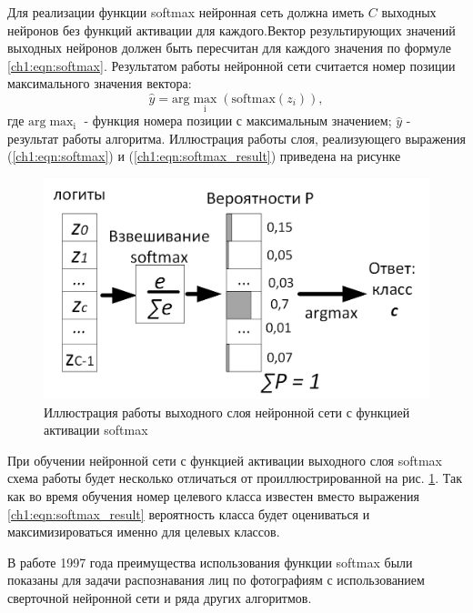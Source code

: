 \documentclass[12pt]{article}
\begin{document}
\begin{sloppypar}
Для реализации функции softmax нейронная сеть должна иметь $C$ выходных нейронов без функций активации для каждого.Вектор результирующих значений выходных нейронов должен быть пересчитан для каждого значения по формуле  \ref{ch1:eqn:softmax}. Результатом работы нейронной сети считается номер позиции максимального значения вектора:
    \begin{equation}
    \label{ch1:eqn:softmax_result}
        \hat y = \mathrm{arg\max_i}(\mathrm{softmax}(z_i)),
    \end{equation}
где $\mathrm{arg\max_i}$ - функция номера позиции с максимальным значением; $\hat y$ - результат работы алгоритма. 
Иллюстрация работы слоя, реализующего выражения (\ref{ch1:eqn:softmax}) и (\ref{ch1:eqn:softmax_result}) приведена на рисунке
\begin{figure}[!h]
	\begin{center}
		\includegraphics[width=0.75\linewidth]{./figuresch1/softmax.png}
		\caption{Иллюстрация работы выходного слоя нейронной сети с функцией активации softmax}		
		\label{ch1:fig:softmax}
	\end{center}
\end{figure}

При обучении нейронной сети с функцией активации выходного слоя softmax схема работы будет несколько отличаться от проиллюстрированной на рис. \ref{ch1:fig:softmax}. Так как во время обучения номер целевого класса известен вместо выражения \ref{ch1:eqn:softmax_result} вероятность класса будет оцениваться и максимизироваться именно для целевых классов. 

В работе \cite{lawrence1997face} 1997 года преимущества использования функции softmax были показаны для задачи распознавания лиц по фотографиям с использованием сверточной нейронной сети и ряда других алгоритмов. 


\end{sloppypar}
\end{document}
